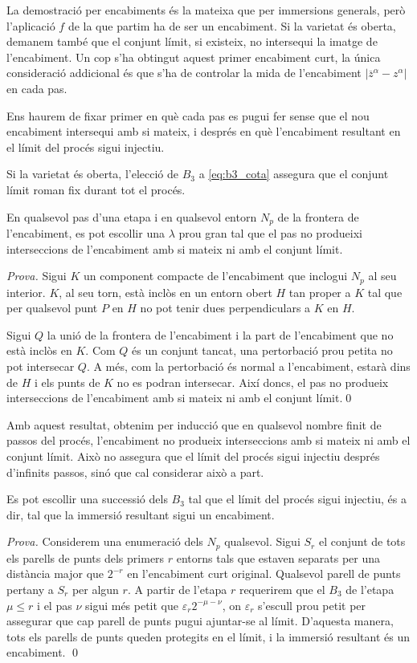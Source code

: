 La demostració per encabiments és la mateixa que per immersions generals, però l'aplicació $f$ de la que partim ha de ser un encabiment. Si la varietat és oberta, demanem també que el conjunt límit, si existeix, no intersequi la imatge de l'encabiment. Un cop s'ha obtingut aquest primer encabiment curt, la única consideració addicional és que s'ha de controlar la mida de l'encabiment $|\overline z^\alpha - z^\alpha|$ en cada pas.

Ens haurem de fixar primer en què cada pas es pugui fer sense que el nou encabiment intersequi amb si mateix, i després en què l'encabiment resultant en el límit del procés sigui injectiu.
\begin{obs}
    Si la varietat és oberta, l'elecció de $B_3$ a \eqref{eq:b3_cota} assegura que el conjunt límit roman fix durant tot el procés.
\end{obs}
\begin{prop}
    En qualsevol pas d'una etapa i en qualsevol entorn $N_p$ de la frontera de l'encabiment, es pot escollir una $\lambda$ prou gran tal que el pas no produeixi interseccions de l'encabiment amb si mateix ni amb el conjunt límit.
\end{prop}
{
\color{black!50!green} \textit{Prova.} 
    Sigui $K$ un component compacte de l'encabiment que inclogui $N_p$ al seu interior. $K$, al seu torn, està inclòs en un entorn obert $H$ tan proper a $K$ tal que per qualsevol punt $P$ en $H$ no pot tenir dues perpendiculars a $K$ en $H$.

    Sigui $Q$ la unió de la frontera de l'encabiment i la part de l'encabiment que no està inclòs en $K$. Com $Q$ és un conjunt tancat, una pertorbació prou petita no pot intersecar $Q$. A més, com la pertorbació és normal a l'encabiment, estarà dins de $H$ i els punts de $K$ no es podran intersecar. Així doncs, el pas no produeix interseccions de l'encabiment amb si mateix ni amb el conjunt límit.\qed
}

Amb aquest resultat, obtenim per inducció que en qualsevol nombre finit de passos del procés, l'encabiment no produeix interseccions amb si mateix ni amb el conjunt límit. Això no assegura que el límit del procés sigui injectiu després d'infinits passos, sinó que cal considerar això a part.

\begin{prop}
    Es pot escollir una successió dels $B_3$ tal que el límit del procés sigui injectiu, és a dir, tal que la immersió resultant sigui un encabiment.
\end{prop}
{
\color{black!50!green} \textit{Prova.} 
    Considerem una enumeració dels $N_p$ qualsevol. Sigui $S_r$ el conjunt de tots els parells de punts dels primers $r$ entorns tals que estaven separats per una distància major que $2^{-r}$ en l'encabiment curt original. Qualsevol parell de punts pertany a $S_r$ per algun $r$. A partir de l'etapa $r$ requerirem que el $B_3$ de l'etapa $\mu\le r$ i el pas $\nu$ sigui més petit que $\varepsilon_r2^{-\mu-\nu}$, on $\varepsilon_r$ s'escull prou petit per assegurar que cap parell de punts pugui ajuntar-se al límit. D'aquesta manera, tots els parells de punts queden protegits en el límit, i la immersió resultant és un encabiment. \qed
}

